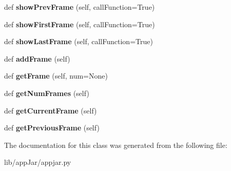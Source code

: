 \begin{DoxyCompactItemize}
\mbox{\label{classappjar_1_1_frame_stack_a6871c26a840c6023a40a7fb885c3b947}} 
def {\bfseries show\+Prev\+Frame} (self, call\+Function=True)
\item 
\mbox{\label{classappjar_1_1_frame_stack_a083b2f23e50f9c563bda536b67b168bc}} 
def {\bfseries show\+First\+Frame} (self, call\+Function=True)
\item 
\mbox{\label{classappjar_1_1_frame_stack_a8ecf847d55d84b9919487e189651cb9d}} 
def {\bfseries show\+Last\+Frame} (self, call\+Function=True)
\item 
\mbox{\label{classappjar_1_1_frame_stack_a6e7443bfd397e589bcafbb8013855a2a}} 
def {\bfseries add\+Frame} (self)
\item 
\mbox{\label{classappjar_1_1_frame_stack_ab0e5a0f5afe5bf488d2242213dc75d00}} 
def {\bfseries get\+Frame} (self, num=None)
\item 
\mbox{\label{classappjar_1_1_frame_stack_add55d9ad9e21cddda85cfe622c7b0ce5}} 
def {\bfseries get\+Num\+Frames} (self)
\item 
\mbox{\label{classappjar_1_1_frame_stack_af7f1489ede64f4514ad3aa9c522f4fc7}} 
def {\bfseries get\+Current\+Frame} (self)
\item 
\mbox{\label{classappjar_1_1_frame_stack_a7f3d8b795cec96f92fd85df80cbda137}} 
def {\bfseries get\+Previous\+Frame} (self)
\end{DoxyCompactItemize}


The documentation for this class was generated from the following file\+:\begin{DoxyCompactItemize}
\item 
lib/app\+Jar/appjar.\+py\end{DoxyCompactItemize}
